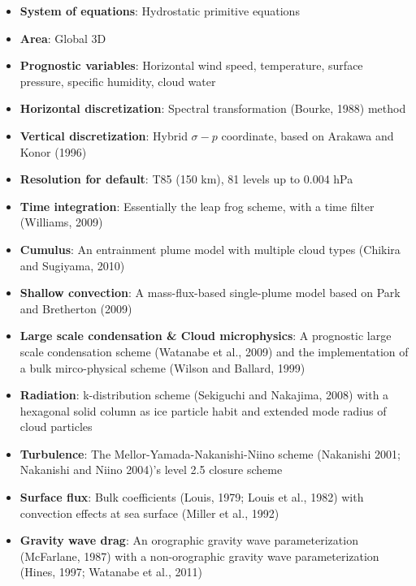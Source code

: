 \begin{itemize}
\tightlist
\item
  \textbf{System of equations}: Hydrostatic primitive equations
\item
  \textbf{Area}: Global 3D
\item
  \textbf{Prognostic variables}: Horizontal wind speed, temperature, surface pressure, specific humidity, cloud water
\item
  \textbf{Horizontal discretization}: Spectral transformation (Bourke, 1988) method
\item
  \textbf{Vertical discretization}: Hybrid \(\sigma - p\) coordinate, based on Arakawa and Konor (1996)
\item
  \textbf{Resolution for default}: T85 (150 km), 81 levels up to 0.004 hPa
\item
  \textbf{Time integration}: Essentially the leap frog scheme, with a time filter (Williams, 2009)
\item
  \textbf{Cumulus}: An entrainment plume model with multiple cloud types (Chikira and Sugiyama, 2010)
\item
  \textbf{Shallow convection}: A mass-flux-based single-plume model based on Park and Bretherton (2009)
\item
  \textbf{Large scale condensation \& Cloud microphysics}: A prognostic large scale condensation scheme (Watanabe et al., 2009) and the implementation of a bulk mirco-physical scheme (Wilson and
  Ballard, 1999)
\item
  \textbf{Radiation}: k-distribution scheme (Sekiguchi and Nakajima, 2008) with a hexagonal solid column as ice particle habit and extended mode radius of cloud particles
\item
  \textbf{Turbulence}: The Mellor-Yamada-Nakanishi-Niino scheme (Nakanishi 2001; Nakanishi and Niino 2004)'s level 2.5 closure scheme
\item
  \textbf{Surface flux}: Bulk coefficients (Louis, 1979; Louis et al., 1982) with convection effects at sea surface (Miller et al., 1992)
\item
  \textbf{Gravity wave drag}: An orographic gravity wave parameterization (McFarlane, 1987) with a non-orographic gravity wave parameterization (Hines, 1997; Watanabe et al., 2011)
\end{itemize}
